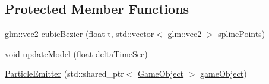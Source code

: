 \subsection*{Protected Member Functions}
\begin{DoxyCompactItemize}
\item 
glm\+::vec2 \hyperlink{class_mason_1_1_particle_emitter_a9750a2b4f2f644691822b266359f1c86}{cubic\+Bezier} (float t, std\+::vector$<$ glm\+::vec2 $>$ spline\+Points)
\item 
void \hyperlink{class_mason_1_1_particle_emitter_a00459b3ebe215bede4427ad1e8e3f7dc}{update\+Model} (float delta\+Time\+Sec)
\item 
\hyperlink{class_mason_1_1_particle_emitter_a6a985b19a4f37f242030afe2c8cc5545}{Particle\+Emitter} (std\+::shared\+\_\+ptr$<$ \hyperlink{class_mason_1_1_game_object}{Game\+Object} $>$ \hyperlink{class_mason_1_1_component_abaa67b569d0a70e26a4606f4a099a925}{game\+Object})
\end{DoxyCompactItemize}
